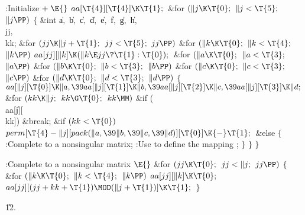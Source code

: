 \Y\B\4:Initialize\X${}\mathrel+\E{}$\6
$\\{aa}[\T{4}][\T{4}]\K\T{1};{}$\6
\&{for} ${}(\|j\K\T{0};{}$ ${}\|j<\T{5};{}$ ${}\|j\PP){}$\5
${}\{{}$\1\6
\&{int} \|a${},{}$ \|b${},{}$ \|c${},{}$ \|d${},{}$ \|e${},{}$ \|f${},{}$ %
\|g${},{}$ \|h${},{}$ \\{jj}${},{}$ \\{kk};\7
\&{for} ${}(\\{jj}\K\|j+\T{1};{}$ ${}\\{jj}<\T{5};{}$ ${}\\{jj}\PP){}$\1\6
\&{for} ${}(\|k\K\T{0};{}$ ${}\|k<\T{4};{}$ ${}\|k\PP){}$\1\5
${}\\{aa}[\\{jj}][\|k]\K(\|k\E\\{jj}\?\T{1}:\T{0});{}$\2\2\6
\&{for} ${}(\|a\K\T{0};{}$ ${}\|a<\T{3};{}$ ${}\|a\PP){}$\1\6
\&{for} ${}(\|b\K\T{0};{}$ ${}\|b<\T{3};{}$ ${}\|b\PP){}$\1\6
\&{for} ${}(\|c\K\T{0};{}$ ${}\|c<\T{3};{}$ ${}\|c\PP){}$\1\6
\&{for} ${}(\|d\K\T{0};{}$ ${}\|d<\T{3};{}$ ${}\|d\PP){}$\5
${}\{{}$\1\6
${}\\{aa}[\|j][\T{0}]\K\|a,\39\\{aa}[\|j][\T{1}]\K\|b,\39\\{aa}[\|j][\T{2}]\K%
\|c,\39\\{aa}[\|j][\T{3}]\K\|d;{}$\6
\&{for} ${}(\\{kk}\K\|j;{}$ ${}\\{kk}\G\T{0};{}$ ${}\\{kk}\MM){}$\1\6
\&{if} (\\{aa}[\|j][\\{kk}])\1\5
\&{break};\2\2\6
\&{if} ${}(\\{kk}<\T{0}){}$\1\5
${}\\{perm}[\T{4}-\|j][\\{pack}(\|a,\39\|b,\39\|c,\39\|d)][\T{0}]\K{-}\T{1};{}$%
\2\6
\&{else}\5
${}\{{}$\1\6
:Complete  to a nonsingular matrix\X;\6
:Use  to define the mapping \X;\6
\4${}\}{}$\2\6
\4${}\}{}$\2\2\2\2\6
\4${}\}{}$\2\par
\fi

\B{}:Complete  to a nonsingular matrix%
\X${}\E{}$\6
\&{for} ${}(\\{jj}\K\T{0};{}$ ${}\\{jj}<\|j;{}$ ${}\\{jj}\PP){}$\5
${}\{{}$\1\6
\&{for} ${}(\|k\K\T{0};{}$ ${}\|k<\T{4};{}$ ${}\|k\PP){}$\1\5
${}\\{aa}[\\{jj}][\|k]\K\T{0};{}$\2\6
${}\\{aa}[\\{jj}][(\\{jj}+\\{kk}+\T{1})\MOD(\|j+\T{1})]\K\T{1};{}$\6
\4${}\}{}$\2\par
\U12.\fi

